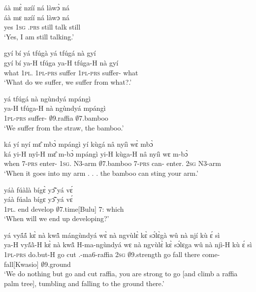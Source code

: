 \begin{exe}[(C234)]  
\exC\label{11}
  \glll     áà mɛ̀ nzíí ná làwɔ̀ ná \\
            áà mɛ nzíí ná làwɔ ná \\
              yes 1\textsc{sg} {\PROG}.\textsc{prs} still talk still \\
    \trans `Yes, I am still talking.'
 
\exC\label{12}
  \glll     gyí bí yá tfúgà yá tfúgá nà gyí \\
             gyí bí ya-H tfúga ya-H tfúga-H nà gyí\\
              what 1\textsc{pl}.{\SBJ}  1\textsc{pl}-\textsc{prs} suffer 1\textsc{pl}-\textsc{prs} suffer-{\R} {\COM} what \\
    \trans `What do we suffer, we suffer from what?.'
 
\exC\label{13}
  \glll     yá tfúgá nà ngùndyá mpángì \\
            ya-H tfúga-H nà ngùndyá mpángì \\
              1\textsc{pl}-\textsc{prs} suffer-{\R} {\COM} $\emptyset$9.raffia $\emptyset$7.bamboo \\
    \trans `We suffer from the straw, the bamboo.'
 
\exC\label{14}
  \glll    ká yí nyí mɛ̂ mbɔ̀ mpángì yí kùgá nâ nyíì wɛ̀ mbɔ̀ \\
           ká yi-H nyî-H mɛ̂ m-bɔ̀ mpángì yi-H kùga-H nâ nyíì wɛ m-bɔ̀ \\
             when 7-\textsc{prs} enter-{\R} 1\textsc{sg}.{\OBJ} N3-arm $\emptyset$7.bamboo 7-\textsc{prs} can-{\R} {\COMP} enter.{\SBJV}  2\textsc{sg} N3-arm  \\
    \trans `When it goes into my arm . . . the bamboo can sting your arm.'
 
\exC\label{15}
  \glll     yáà fúàlà bígɛ̀ yɔ̃̂ yá vɛ́ \\
          yáà fúala bígɛ yɔ̃̂ yá vɛ́ \\
              1\textsc{pl}.{\FUT} end develop $\emptyset$7.time[Bulu] 7:{\ATT}  which \\
    \trans `When will we end up developing?'
 
\exC\label{16}
  \glll     yá vyã́ã́ kɛ̀ nà kwã̂ mángùndyá wɛ̀ nà ngvùlɛ̀ kɛ̀ sɔ́lɛ̀gà wû nà njí kù ɛ́ sì \\
            ya-H vyã́ã̀-H kɛ̀ nà kwã̂ H-ma-ngùndyá wɛ nà ngvùlɛ̀ kɛ̀ sɔ́lɛga wû nà njì-H kù ɛ́ sì\\
              1\textsc{pl}-\textsc{prs} do.but-H go {\CONJ} cut {\OBJ}.{\LINK}-ma6-raffia 2\textsc{sg} {\COM} $\emptyset$9.strength go fall there {\COM} come-{\R} fall[Kwasio] {\LOC} $\emptyset$9.ground\\
    \trans `We do nothing but go and cut raffia, you are strong to go [and climb a raffia palm tree], tumbling and falling to the ground there.'
 

\end{exe}
